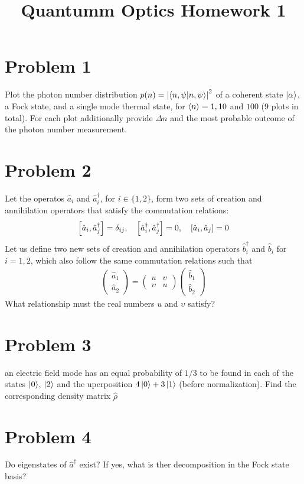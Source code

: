 \documentclass[../main.tex]{subfiles}
\title{ Quantumm Optics Homework 1}
\begin{document}
\section*{Problem 1}
Plot the photon number distribution $p(n)=\abs{\braket{n,\psi}}^2$ of a coherent state $\ket{\alpha}$, a Fock state, and a single mode thermal state, for $\expval{n}=1,10$ and $100$ (9 plots in total).
For each plot additionally provide $\Delta n$ and the most probable outcome of the photon number measurement.

\section*{Problem 2}
Let the operatos $\hat{a}_i$ and $\hat{a}^\dagger_i$, for $i\in\{1,2\}$, form two sets of creation and annihilation operators that satisfy the commutation relations: 
\begin{gather*}
    \qty[\hat{a}_i,\hat{a}^\dagger_j] = \delta_{ij},\quad
    \qty[\hat{a}_i^\dagger,\hat{a}^\dagger_j] = 0 ,\quad
    \qty[\hat{a}_i,\hat{a}_j] = 0 
\end{gather*}
Let us define two new sets of creation and annihilation operators $\hat{b}_i^\dagger$ and $\hat{b}_i$ for $i=1,2$, which also follow the same commutation relations such that
\begin{gather*}
    \begin{pmatrix}
        \hat{a}_1 \\ \hat{a}_2
    \end{pmatrix}
    =
    \begin{pmatrix}
        u & \upsilon \\
        \upsilon & u
    \end{pmatrix}
    \begin{pmatrix}
        \hat{b}_1 \\ \hat{b}_2
    \end{pmatrix}
\end{gather*}
What relationship must the real numbers $u$ and $\upsilon$ satisfy?

\section*{Problem 3}
an electric field mode has an equal probability of $1/3$ to be found in each of the states $\ket{0}$, $\ket{2}$ and the uperposition $4\ket{0}+3\ket{1}$ (before normalization).
Find the corresponding density matrix $\hat{\rho}$

\section*{Problem 4}
Do eigenstates of $\hat{a}^\dagger$ exist?
If yes, what is ther decomposition in the Fock state basis?
\end{document}
